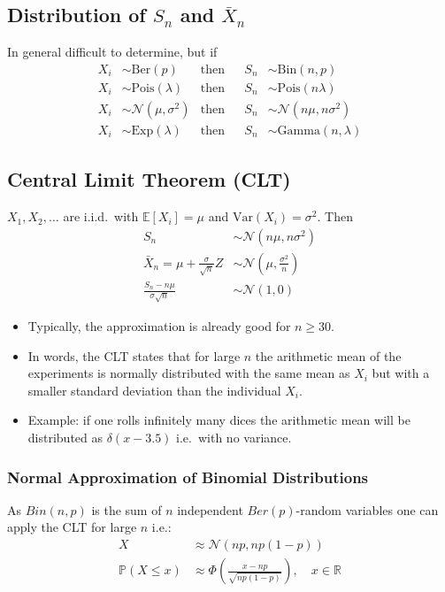 \subsection[LLN Examples]{Distribution of $S_n$ and $\bar{X}_n$}
In general difficult to determine, but if
\noindent\begin{align*}
    X_i & \sim \mathrm{Ber}(p)            & \text{then} &  & S_n & \sim \mathrm{Bin}(n,p)            \\
    X_i & \sim \mathrm{Pois}(\lambda)     & \text{then} &  & S_n & \sim \mathrm{Pois}(n\lambda)      \\
    X_i & \sim \mathcal{N}(\mu, \sigma^2) & \text{then} &  & S_n & \sim \mathcal{N}(n\mu, n\sigma^2) \\
    X_i & \sim \mathrm{Exp}(\lambda)      & \text{then} &  & S_n & \sim \mathrm{Gamma}(n, \lambda)
\end{align*}

\subsection{Central Limit Theorem (CLT)}
$X_1, X_2, \ldots$ are i.i.d.\ with $\mathbb{E}[X_i]=\mu$ and $\mathrm{Var}(X_i)=\sigma^2$. Then
\begin{align*}
    S_n                                      & \sim \mathcal{N}(n\mu, n\sigma^2)         \\
    \bar{X}_n = \mu+\frac{\sigma}{\sqrt{n}}Z & \sim \mathcal{N}(\mu, \frac{\sigma^2}{n}) \\
    \frac{S_n-n\mu}{\sigma \sqrt{n}}         & \sim\mathcal{N}(1,0)
\end{align*}


\begin{itemize}
    \item Typically, the approximation is already good for $n \geq 30$.
    \item In words, the CLT states that for large $n$ the arithmetic mean of the experiments is normally distributed with the same mean as $X_i$ but with a smaller standard deviation than the individual $X_i$.
    \item Example: if one rolls infinitely many dices the arithmetic mean will be distributed as $\delta(x-3.5)$ i.e.\ with no variance.
\end{itemize}
\subsubsection{Normal Approximation of Binomial Distributions}
As $Bin(n,p)$ is the sum of $n$ independent $Ber(p)$-random variables one can apply the CLT for large $n$ i.e.:
\begin{align*}
    X                   & \approx\mathcal{N}(np,np(1-p))                                           \\
    \mathbb{P}(X\leq x) & \approx\Phi\left(\frac{x-np}{\sqrt{np(1-p)}}\right),\quad x\in\mathbb{R}
\end{align*}
